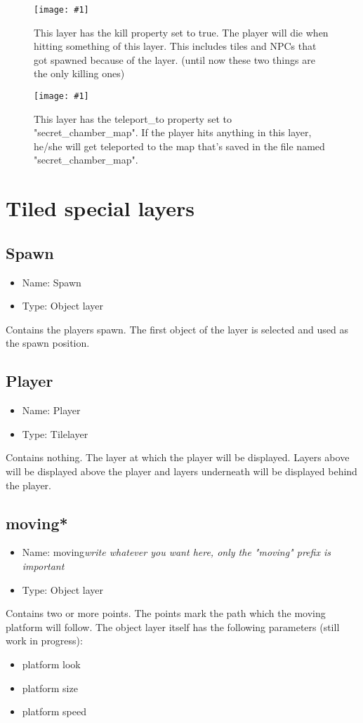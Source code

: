 \documentclass{article}
\newcommand{\erklaerbild}[2]{
	\begin{figure}[H]
		\center
		\texttt{[image: \#1]}
		\caption{#2}
	\end{figure}
}
\begin{document}
\erklaerbild
	{custom_prop_kill.png}
	{This layer has the kill property set to true. The player will die when hitting something of this layer. This includes tiles and NPCs that got spawned because of the layer. (until now these two things are the only killing ones)}

\erklaerbild
	{custom_prop_teleport_to.png}
	{This layer has the teleport\_to property set to "secret\_chamber\_map". If the player hits anything in this layer, he/she will get teleported to the map that's saved in the file named "secret\_chamber\_map".}

\section{Tiled special layers}
\subsection{Spawn}
\begin{itemize}
	\item Name: Spawn
	\item Type: Object layer
\end{itemize}

Contains the players spawn. The first object of the layer is selected and used as the spawn position.

\subsection{Player}
\begin{itemize}
	\item Name: Player
	\item Type: Tilelayer
\end{itemize}

Contains nothing. The layer at which the player will be displayed. Layers above will be displayed above the player and layers underneath will be displayed behind the player.

\subsection{moving*}
\begin{itemize}
	\item Name: moving\textit{write whatever you want here, only the "moving" prefix is important}
	\item Type: Object layer
\end{itemize}

Contains two or more points. The points mark the path which the moving platform will follow. The object layer itself has the following parameters (still work in progress):
\begin{itemize}
 	\item platform look
 	\item platform size
 	\item platform speed
\end{itemize}
\end{document}
